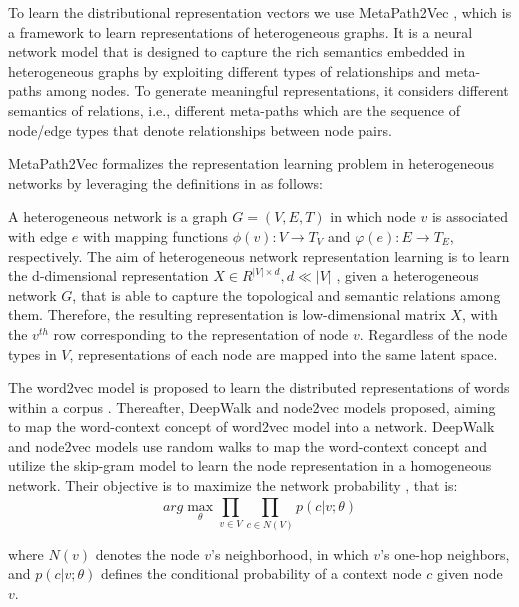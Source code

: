 To learn the distributional representation vectors we use MetaPath2Vec \cite{dong2017metapath2vec, pal2016deep}, which is a framework to learn representations of heterogeneous graphs. It is a neural network model that is designed to capture the rich semantics embedded in heterogeneous graphs by exploiting different types of relationships and meta-paths among nodes. To generate meaningful representations, it considers different semantics of relations, i.e., different meta-paths which are the sequence of node/edge types that denote relationships between node pairs.

MetaPath2Vec formalizes the representation learning problem in heterogeneous networks by leveraging the definitions in \cite{dong2017metapath2vec, sun2013pathselclus} as follows:

A heterogeneous network is a graph $G = (V, E, T)$ in which node $v$ is associated with edge $e$ with mapping functions $\phi(v) : V \to T_{V}$ and $\varphi(e) : E \to T_{E}$, respectively. The aim of heterogeneous network representation learning is to learn the d-dimensional representation $X \in R^{|V|\times d}, d \ll |V|$ , given a heterogeneous network $G$, that is able to capture the topological and semantic relations among them. Therefore, the resulting representation is low-dimensional matrix $X$, with the $v^{th}$  row corresponding to the representation of node $v$. Regardless of the node types in $V$, representations of each node are mapped into the same latent space. 

The word2vec model is proposed to learn the distributed representations of words within a corpus \cite{mikolov2013efficient, mikolov2013distributed}. Thereafter, DeepWalk \cite{perozzi2014deepwalk} and node2vec \cite{grover2016node2vec} models proposed, aiming to map the word-context concept of word2vec model into a network. DeepWalk and node2vec models use random walks to map the word-context concept and utilize the skip-gram model to learn the node representation in a homogeneous network. Their objective is to maximize the network probability \cite{mikolov2013distributed, perozzi2014deepwalk, grover2016node2vec}, that is:
\begin{equation}
    arg \max_{\theta} \prod_{v \in V}^{} \prod_{c \in N(V)}^{} p(c|v;\theta)
\end{equation}

where $N(v)$ denotes the node $v$'s neighborhood, in which $v$'s one-hop neighbors, and $p(c|v;\theta)$ defines the conditional probability of a context node $c$ given node $v$.

